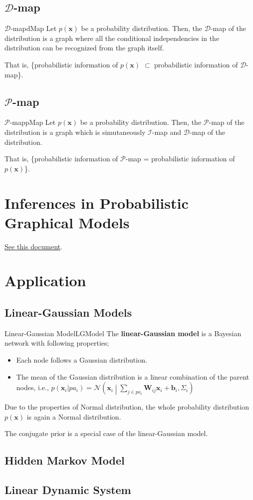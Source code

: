 \documentclass{article}
\begin{document}
    \subsection{$\mathcal D$-map}
        \begin{defn}{$\mathcal D$-map}{dMap}
            Let $p(\mathbf{x})$ be a probability distribution. Then, the $\mathcal D$-map of the
            distribution is a graph where all the conditional independencies in the distribution
            can be recognized from the graph itself.
        \end{defn}
        That is, \{probabilistic information of $p(\mathbf{x})$ $\subset$ probabilistic information of $\mathcal D$-map\}.
    \subsection{$\mathcal P$-map}
        \begin{defn}{$\mathcal P$-map}{pMap}
            Let $p(\mathbf{x})$ be a probability distribution. Then, the $\mathcal P$-map of the
            distribution is a graph which is simutaneously $\mathcal I$-map and $\mathcal D$-map
            of the distribution.
        \end{defn}
        That is, \{probabilistic information of $\mathcal P$-map = probabilistic information of $p(\mathbf{x})$\}.

\section{Inferences in Probabilistic Graphical Models}
    \href{run:../../inference/exact_inference/exact_inference.pdf}{See this document}.

\section{Application}
    \subsection{Linear-Gaussian Models}
        \begin{defn}{Linear-Gaussian Model}{LGModel}
            The \textbf{linear-Gaussian model} is a Bayesian network with following properties;
            \begin{itemize}
                \item Each node follows a Gaussian distribution.
                \item The mean of the Gaussian distribution is a linear combination of the parent nodes, i.e.,
                    $p(\mathbf{x}_i|pa_i)=\mathcal N \left(\textbf{x}_i \middle| \sum_{j \in pa_i}\mathbf{W}_{ij}\mathbf{x}_i + \mathbf{b}_i, \Sigma_i\right)$
            \end{itemize}
            Due to the properties of Normal distribution, the whole probability distribution $p(\textbf{x})$ is again a Normal distribution.
        \end{defn}
        The conjugate prior is a special case of the linear-Gaussian model.
    \subsection{Hidden Markov Model}
    \subsection{Linear Dynamic System} 
\end{document}
